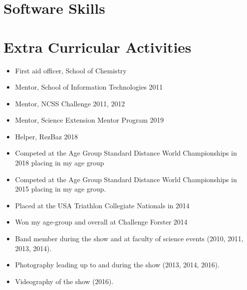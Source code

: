 \section{Software Skills}


\section{Extra Curricular Activities}

{%
  \begin{itemize}
    \item First aid officer, School of Chemistry
    \item Mentor, School of Information Technologies 2011
    \item Mentor, NCSS Challenge 2011, 2012
    \item Mentor, Science Extension Mentor Program 2019
    \item Helper, RezBaz 2018
  \end{itemize}
}

{%
\begin{itemize}
  \item Competed at the Age Group Standard Distance World Championships in 2018 placing  in my age group
  \item Competed at the Age Group Standard Distance World Championships in 2015 placing  in my age group.
  \item Placed  at the USA Triathlon Collegiate Nationals in 2014
  \item Won my age-group and  overall at Challenge Forster 2014
\end{itemize}
}

{%
\begin{itemize}
  \item Band member during the show and at faculty of science events (2010, 2011, 2013, 2014).
  \item Photography leading up to and during the show (2013, 2014, 2016).
  \item Videography of the show (2016).
\end{itemize}
}


